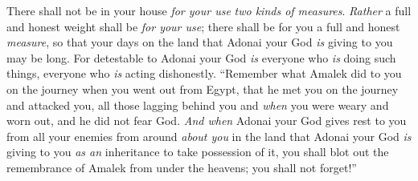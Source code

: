 \begin{biblechapter}
\verse There shall not be in your house \textit{for your use} \textit{two kinds of measures}.
\verse \textit{Rather} a full and honest weight shall be \textit{for your use}; there shall be for you a full and honest \textit{measure}, so that your days on the land that Adonai your God \textit{is} giving to you may be long.
\verse For detestable to Adonai your God \textit{is} everyone who \textit{is} doing such things, everyone who \textit{is} acting dishonestly.
\verse “Remember what Amalek did to you on the journey when you went out from Egypt,
\verse that he met you on the journey and attacked you, all those lagging behind you and \textit{when} you were weary and worn out, and he did not fear God.
\verse \textit{And when} Adonai your God gives rest to you from all your enemies from around \textit{about you} in the land that Adonai your God \textit{is} giving to you \textit{as an} inheritance to take possession of it, you shall blot out the remembrance of Amalek from under the heavens; you shall not forget!”
\end{biblechapter}

